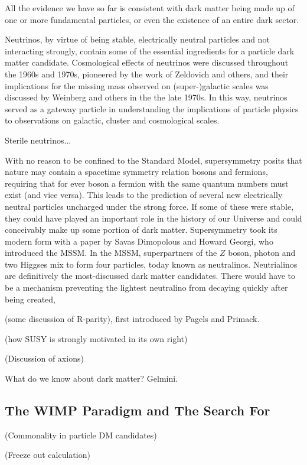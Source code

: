 All the evidence we have so far is consistent with dark matter being made up of one or more fundamental particles, or even the existence of an entire dark sector.

Neutrinos, by virtue of being stable, electrically neutral particles and not interacting strongly, contain some of the essential ingredients for a particle dark matter candidate. Cosmological effects of neutrinos were discussed throughout the 1960s and 1970s, pioneered by the work of Zeldovich and others, and their implications for the missing mass observed on (super-)galactic scales was discussed by Weinberg and others in the the late 1970s. In this way, neutrinos served as a gateway particle in understanding the implications of particle physics to observations on galactic, cluster and cosmological scales.

Sterile neutrinos...

With no reason to be confined to the Standard Model, supersymmetry posits that nature may contain a spacetime symmetry relation bosons and fermions, requiring that for ever boson a fermion with the same quantum numbers must exist (and vice versa). This leads to the prediction of several new electrically neutral particles uncharged under the strong force. If some of these were stable, they could have played an important role in the history of our Universe and could conceivably make up some portion of dark matter. Supersymmetry took its modern form with a paper by Savas Dimopolous and Howard Georgi, who introduced the MSSM. In the MSSM, superpartners of the $Z$ boson, photon and two Higgses mix to form four particles, today known as neutralinos. Neutrialinos are definitively the most-discussed dark matter candidates. There would have to be a mechanism preventing the lightest neutralino from decaying quickly after being created, 

(some discussion of R-parity), first introduced by Pagels and Primack.

(how SUSY  is strongly motivated in its own right)

(Discussion of axions)

What do we know about dark matter? Gelmini.

\subsection{The WIMP Paradigm and The Search For}

(Commonality in particle DM candidates)

(Freeze out calculation)

